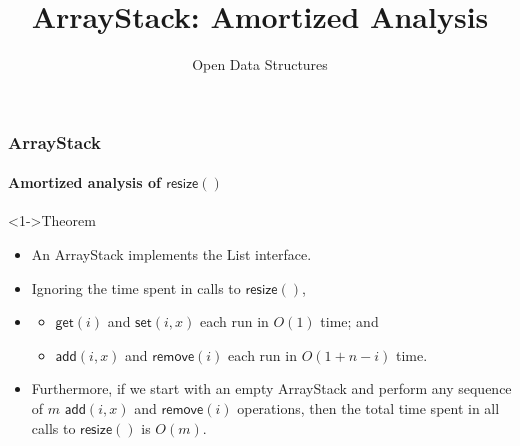 \documentclass[aspectratio=169,xcolor=dvipsnames]{beamer}
\title{ArrayStack: Amortized Analysis}
\author{Open Data Structures}
\begin{document}
\begin{frame}
  \titlepage
\end{frame}

\begin{frame}
  \frametitle{ArrayStack}
  \framesubtitle{Amortized analysis of $\mathsf{resize}()$}
  \begin{block}<1->{Theorem}
    \begin{itemize}
      \item[]An ArrayStack implements the List interface.
      \item<1-| alert@2>[]Ignoring the time spent in calls to $\mathsf{resize}()$,
      \item[]
      \begin{itemize}
          \item$\mathsf{get}(i)$ and $\mathsf{set}(i,x)$ each run in $O(1)$ time; and
          \item$\mathsf{add}(i,x)$ and $\mathsf{remove}(i)$ each run in $O(1+n-i)$ time.
      \end{itemize}
      \item<3->[]Furthermore, if we start with an empty ArrayStack and perform any sequence of $m$ $\mathsf{add}(i,x)$ and $\mathsf{remove}(i)$ operations, then the total time spent in all calls to $\mathsf{resize}()$ is $O(m)$.
    \end{itemize}
  \end{block}
\end{frame}


\newlength{\nwidth}
\setlength{\fboxsep}{0pt}
\setlength{\nwidth}{.25\textwidth}
\end{document}
